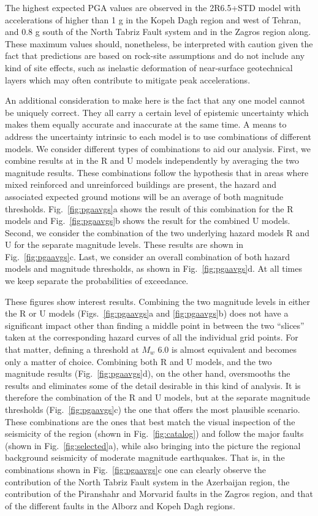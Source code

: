 The highest expected PGA values are observed in the 2R6.5+STD model with accelerations of higher than 1 g in the Kopeh Dagh region and west of Tehran, and 0.8 g south of the North Tabriz Fault system and in the Zagros region along. These maximum values should, nonetheless, be interpreted with caution given the fact that predictions are based on rock-site assumptions and do not include any kind of site effects, such as inelastic deformation of near-surface geotechnical layers which may often contribute to mitigate peak accelerations.

An additional consideration to make here is the fact that any one model cannot be uniquely correct. They all carry a certain level of epistemic uncertainty which makes them equally accurate and inaccurate at the same time. A means to address the uncertainty intrinsic to each model is to use combinations of different models. We consider different types of combinations to aid our analysis. First, we combine results at in the R and U models independently by averaging the two magnitude results. These combinations follow the hypothesis that in areas where mixed reinforced and unreinforced buildings are present, the hazard and associated expected ground motions will be an average of both magnitude thresholds. Fig.~\ref{fig:pgaavgs}a shows the result of this combination for the R models and Fig.~\ref{fig:pgaavgs}b shows the result for the combined U models. Second, we consider the combination of the two underlying hazard models R and U for the separate magnitude levels. These results are shown in Fig.~\ref{fig:pgaavgs}c. Last, we consider an overall combination of both hazard models and magnitude thresholds, as shown in Fig.~\ref{fig:pgaavgs}d. At all times we keep separate the probabilities of exceedance.

These figures show interest results. Combining the two magnitude levels in either the R or U models (Figs.~\ref{fig:pgaavgs}a and \ref{fig:pgaavgs}b) does not have a significant impact other than finding a middle point in between the two ``slices'' taken at the corresponding hazard curves of all the individual grid points. For that matter, defining a threshold at $M_w$ 6.0 is almost equivalent and becomes only a matter of choice. Combining both R and U models, and the two magnitude results (Fig.~\ref{fig:pgaavgs}d), on the other hand, oversmooths the results and eliminates some of the detail desirable in this kind of analysis. It is therefore the combination of the R and U models, but at the separate magnitude thresholds (Fig.~\ref{fig:pgaavgs}c) the one that offers the most plausible scenario. These combinations are the ones that best match the visual inspection of the seismicity of the region (shown in Fig.~\ref{fig:catalog}) and follow the major faults (shown in Fig.~\ref{fig:selected}a), while also bringing into the picture the regional background seismicity of moderate magnitude earthquakes. That is, in the combinations shown in Fig.~\ref{fig:pgaavgs}c one can clearly observe the contribution of the North Tabriz Fault system in the Azerbaijan region, the contribution of the Piranshahr and Morvarid faults in the Zagros region, and that of the different faults in the Alborz and Kopeh Dagh regions. 

